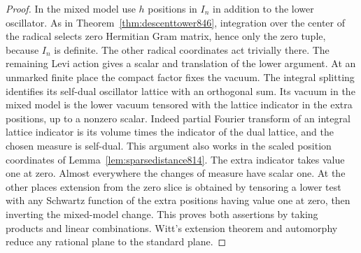 \documentclass[a4paper,11pt]{article}
\theoremstyle{definition}
\theoremstyle{remark}
\numberwithin{equation}{section}
\begin{document}
\begin{proof}
In the mixed model use \(h\) positions in \(I_n\) in addition
to the lower oscillator. As in Theorem~\ref{thm:descenttower846},
integration over the center of the radical selects zero
Hermitian Gram matrix, hence only the zero tuple, because
\(I_n\) is definite. The other radical coordinates act trivially
there. The remaining Levi action gives a scalar and translation
of the lower argument. At an unmarked finite place the compact
factor fixes the vacuum. The integral splitting identifies its
self-dual oscillator lattice with an orthogonal sum. Its vacuum
in the mixed model is the lower vacuum tensored with the lattice
indicator in the extra positions, up to a nonzero scalar.
Indeed partial Fourier transform of an integral lattice
indicator is its volume times the indicator of the dual lattice,
and the chosen measure is self-dual. This argument also works in
the scaled position coordinates of Lemma~\ref{lem:sparsedistance814}.
The extra indicator takes value one at zero. Almost everywhere
the changes of measure have scalar one. At the other places
extension from the zero slice is obtained by tensoring a lower
test with any Schwartz function of the extra positions having
value one at zero, then inverting the mixed-model change.
This proves both assertions by taking products and linear
combinations. Witt's extension theorem and automorphy reduce
any rational plane to the standard plane.
\end{proof}
\end{document}
